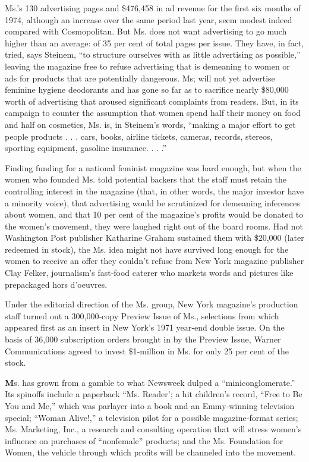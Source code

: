Ms.'s 130 advertising pages and \$476,458 in ad revenue for the first
six months of 1974, although an increase over the same period last year,
seem modest indeed compared with Cosmopolitan. But Ms. does not want
advertising to go much higher than an average: of 35 per cent of total
pages per issue. They have, in fact, tried, says Steinem, ``to structure
ourselves with as little advertising as possible,'' leaving the magazine
free to refuse advertising that is demeaning to women or ads for
products that are potentially dangerous. Ms; will not yet advertise
feminine hygiene deodorants and has gone so far as to sacrifice nearly
\$80,000 worth of advertising that aroused significant complaints from
readers. But, in its campaign to counter the assumption that women spend
half their money on food and half on cosmetics, Ms. is, in Steinem's
words, ``making a major effort to get people products . . . cars, books,
airline tickets, cameras, records, stereos, sporting equipment, gasoline
insurance. . . .''

Finding funding for a national feminist magazine was hard enough, but
when the women who founded Ms. told potential backers that the staff
must retain the controlling interest in the magazine (that, in other
words, the major investor have a minority voice), that advertising would
be scrutinized for demeaning inferences about women, and that 10 per
cent of the magazine's profits would be donated to the women's movement,
they were laughed right out of the board rooms. Had not Washington Post
publisher Katharine Graham sustained them with \$20,000 (later redeemed
in stock), the Ms. idea might not have survived long enough for the
women to receive an offer they couldn't refuse from New York magazine
publisher Clay Felker, journalism's fast‐food caterer who markets words
and pictures like prepackaged hors d'oeuvres.

Under the editorial direction of the Ms. group, New York magazine's
production staff turned out a 300,000‐copy Preview Issue of Ms.,
selections from which appeared first as an insert in New York's 1971
year‐end double issue. On the basis of 36,000 subscription orders
brought in by the Preview Issue, Warner Communications agreed to invest
\$1‐million in Ms. for only 25 per cent of the stock.

\textbf{M}s. has grown from a gamble to what Newsweek dulped a
``miniconglomerate.'' Its spinoffs include a paperback ``Ms. Reader'; a
hit children's record, ``Free to Be You and Me,'' which was parlayer
into a book and an Emmy‐winning television special; ``Woman Alive!,'' a
television pilot for a possible magazine‐format series; Ms. Marketing,
Inc., a research and consulting operation that will stress women's
influence on purchases of ``nonfemale'' products; and the Ms. Foundation
for Women, the vehicle through which profits will be channeled into the
movement.

